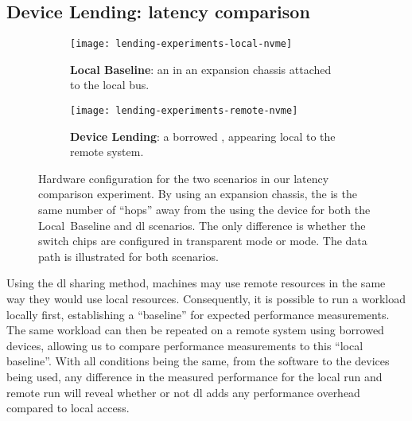 \subsection{Device Lending: latency comparison}\label{sec:eval-lat}
\begin{figure}
    \centering
    \begin{subfigure}{\linewidth}
        \centering
        \texttt{[image: lending-experiments-local-nvme]}
        \caption{\textbf{Local Baseline}: an  in an expansion chassis attached to the local  bus.}
        \label{fig:eval-lending-nvme-local}
    \end{subfigure}
    \par\vspace{10mm}
    \begin{subfigure}{\linewidth}
        \centering
        \texttt{[image: lending-experiments-remote-nvme]}
        \caption{\textbf{Device Lending}: a borrowed , appearing local to the remote system.}
        \label{fig:eval-lending-nvme-remote}
    \end{subfigure}
    \par\vspace{5mm}
    \caption[Hardware configuration for the two scenarios in our latency comparison experiment. By using an expansion chassis, the  is the same number of ``hops'' away from the  using the device for both scenarios]
    {Hardware configuration for the two scenarios in our latency comparison experiment. By using an expansion chassis, the  is the same number of ``hops'' away from the  using the device for both the Local~Baseline and \gls{dl} scenarios. The only difference is whether the switch chips are configured in transparent mode or  mode. The data path is illustrated for both scenarios.}
    \label{fig:eval-lending-nvme-topo}
\end{figure}



Using the \gls{dl} sharing method, machines may use remote resources in the same way they would use local resources.
%
Consequently, it is possible to run a workload locally first, establishing a ``baseline'' for expected performance measurements.
%
The same workload can then be repeated on a remote system using borrowed devices, allowing us to compare performance measurements to this ``local baseline''.
%
With all conditions being the same, from the software to the devices being used, any difference in the measured performance for the local run and remote run will reveal whether or not \gls{dl} adds any performance overhead compared to local access.




